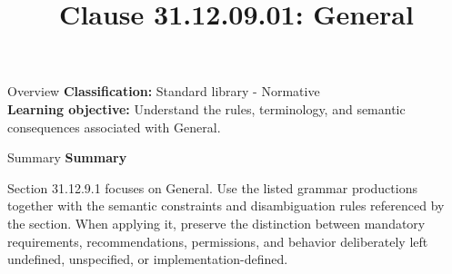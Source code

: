 \documentclass[10pt,letterpaper]{article}
\title{Clause 31.12.09.01: General}
\author{}
\date{}
\begin{document}
\maketitle
\begin{CornellOverviewBox}{Overview}
\textbf{Classification:} Standard library - Normative\\[2pt]
\textbf{Learning objective:} Understand the rules, terminology, and semantic consequences associated with General.
\end{CornellOverviewBox}\begin{CornellSummaryBox}{Summary}
{\sffamily\bfseries\color{Accent} Summary}\par\vspace{3pt}Section 31.12.9.1 focuses on General. Use the listed grammar productions together with the semantic constraints and disambiguation rules referenced by the section. When applying it, preserve the distinction between mandatory requirements, recommendations, permissions, and behavior deliberately left undefined, unspecified, or implementation-defined.
\end{CornellSummaryBox}
\end{document}
